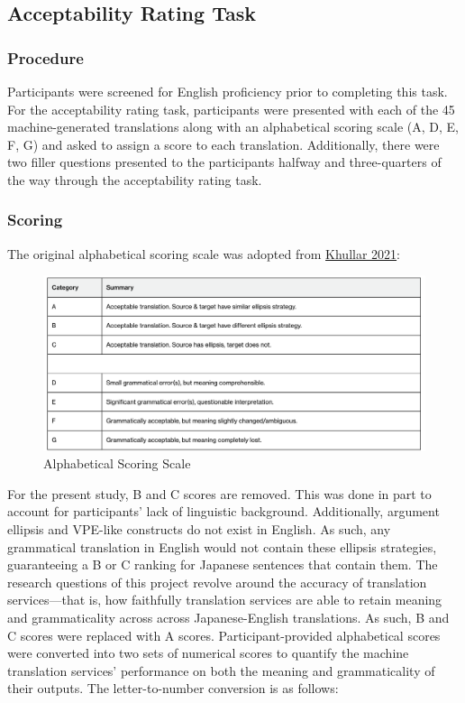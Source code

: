 \documentclass[
  man,floatsintext]{apa6}
\begin{document}
\hypertarget{acceptability-rating-task}{%
\subsection{Acceptability Rating Task}\label{acceptability-rating-task}}

\hypertarget{procedure}{%
\subsubsection{Procedure}\label{procedure}}

Participants were screened for English proficiency prior to completing this task. For the acceptability rating task, participants were presented with each of the 45 machine-generated translations along with an alphabetical scoring scale (A, D, E, F, G) and asked to assign a score to each translation. Additionally, there were two filler questions presented to the participants halfway and three-quarters of the way through the acceptability rating task.

\hypertarget{scoring}{%
\subsubsection{Scoring}\label{scoring}}

The original alphabetical scoring scale was adopted from \href{https://direct.mit.edu/coli/article/47/4/927/106771/Are-Ellipses-Important-for-Machine-Translation}{Khullar 2021}:

\begin{figure}
\centering
\includegraphics{../figs/alphabetical_scoring.png}
\caption{Alphabetical Scoring Scale}
\end{figure}

For the present study, B and C scores are removed. This was done in part to account for participants' lack of linguistic background. Additionally, argument ellipsis and VPE-like constructs do not exist in English. As such, any grammatical translation in English would not contain these ellipsis strategies, guaranteeing a B or C ranking for Japanese sentences that contain them. The research questions of this project revolve around the accuracy of translation services---that is, how faithfully translation services are able to retain meaning and grammaticality across across Japanese-English translations. As such, B and C scores were replaced with A scores.
Participant-provided alphabetical scores were converted into two sets of numerical scores to quantify the machine translation services' performance on both the meaning and grammaticality of their outputs. The letter-to-number conversion is as follows:
\end{document}
